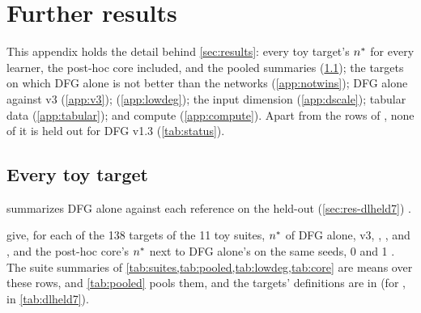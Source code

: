 \clearpage
\section{Further results}\label{app:further}

This appendix holds the detail behind \cref{sec:results}: every toy target's $n^{*}$ for every learner, the post-hoc core included, and the pooled summaries (\cref{app:further-targets}); the targets on which DFG alone is not better than the networks (\cref{app:notwins}); DFG alone against v3 (\cref{app:v3});  (\cref{app:lowdeg}); the input dimension (\cref{app:dscale}); tabular data (\cref{app:tabular}); and compute (\cref{app:compute}). Apart from the rows of , none of it is held out for DFG v1.3 (\cref{tab:status}).

\subsection{Every toy target}\label{app:further-targets}

 summarizes DFG alone against each reference on the held-out  (\cref{sec:res-dlheld7}) .

\begin{table}[t]
\centering{\footnotesize\setlength{\tabcolsep}{3.5pt}
}
\caption{DFG alone against each reference on  (12 targets) . Left: the number of targets that both reach 10\% test error, the mean and median $\log_2\nstar$ ratio of DFG alone to the reference over them, the targets on which DFG alone is clearly better and clearly worse, and the targets that only the reference or only DFG alone reaches. Right: the reference itself against , as mean (clearly better / clearly worse) [both reach] and median. Source:  (\texttt{q1\_dlheld7.summary}, \texttt{.context}).}
\label{tab:dlheld7-summ}
\end{table}

 give, for each of the 138 targets of the 11 toy suites, $n^{*}$ of DFG alone, v3, , ,  and , and the post-hoc core's $n^{*}$ next to DFG alone's on the same seeds, 0 and 1 . The suite summaries of \cref{tab:suites,tab:pooled,tab:lowdeg,tab:core} are means over these rows, and \cref{tab:pooled} pools them, and the targets' definitions are in  (for , in \cref{tab:dlheld7}).


